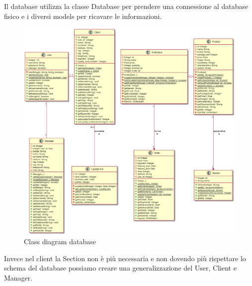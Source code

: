 \documentclass[12pt, a4paper]{article}
\begin{document}
Il database utilizza la classe Database per prendere una connessione al database
fisico e i diversi models per ricavare le informazioni.

\begin{figure}[h]
\centering
\includegraphics[width=\textwidth]{database_models_class.png}
\caption{Class diagram database}
\end{figure}

Invece nel client la Section non è più necessaria e non dovendo più rispettare lo
schema del database possiamo creare una generalizzazione del User, Client e Manager.
\end{document}
